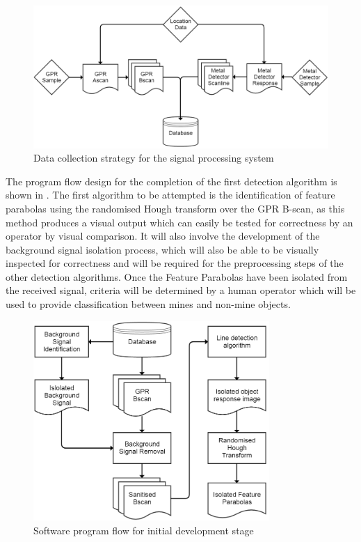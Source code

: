 \documentclass[main.tex]{subfiles}
\begin{document}
\begin{figure}[ht]
\includegraphics[width=\textwidth]{4-DetailedDesign/data-management.png}
\centering
\caption{Data collection strategy for the signal processing system}
\end{figure}

The program flow design for the completion of the first detection algorithm is shown in . The first algorithm to be attempted is the identification of feature parabolas using the randomised Hough transform over the GPR B-scan, as this method produces a visual output which can easily be tested for correctness by an operator by visual comparison. It will also involve the development of the background signal isolation process, which will also be able to be visually inspected for correctness and will be required for the preprocessing steps of the other detection algorithms.
Once the Feature Parabolas have been isolated from the received signal, criteria will be determined by a human operator which will be used to provide classification between mines and non-mine objects.

\begin{figure}[ht]
\includegraphics[width=0.8\textwidth]{4-DetailedDesign/agile-strategy.png}
\centering
\caption{Software program flow for initial development stage}
\end{figure}
\end{document}
